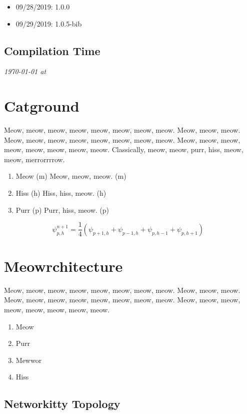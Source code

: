 \documentclass[9pt,oneside]{amsart}
\newcommand*\lipsumeow{Meow, meow, meow, meow, meow, meow, meow, meow.  Meow, meow, meow. Meow, meow, meow, meow, meow, meow, meow, meow. Meow, meow, meow, meow, meow, meow, meow, meow. }
\begin{document}
\begin{multicols}{2}
\begin{itemize}
 \item 09/28/2019: 1.0.0
 \item 09/29/2019: 1.0.5-bib
\end{itemize}

\subsection{Compilation Time}\label{subsec:compilation}

 \textit{{\ddmmyyyydate\today} at \currenttime}


\section{Catground}\label{sec:background}
 \lipsumeow{} 
 Classically, meow, meow, purr, hiss, meow, meow, merrorrrrow.

\begin{enumerate}
 \item Meow (m) Meow, meow, meow. (m)
 \item Hiss (h) Hiss, hiss, meow. (h)
 \item Purr (p) Purr, hiss, meow. (p)
\end{enumerate}

\begin{equation}
\psi_{p,h}^{n+1}=\frac{1}{4}\left( \psi_{p+1,h}+\psi_{p-1,h}+\psi_{p,h-1}+\psi_{p,h+1}\right)\;\;
\label{subsec:mrwhiskers}
\end{equation}

\section{Meowrchitecture}\label{sec:architecture}
 
 \lipsumeow{}
 
\begin{enumerate}
  \item Meow 
  \item Purr
  \item Mewwor
  \item Hiss
\end{enumerate}

\subsection{Networkitty Topology}\label{subsec:network_topology}


\end{multicols}
\end{document}
